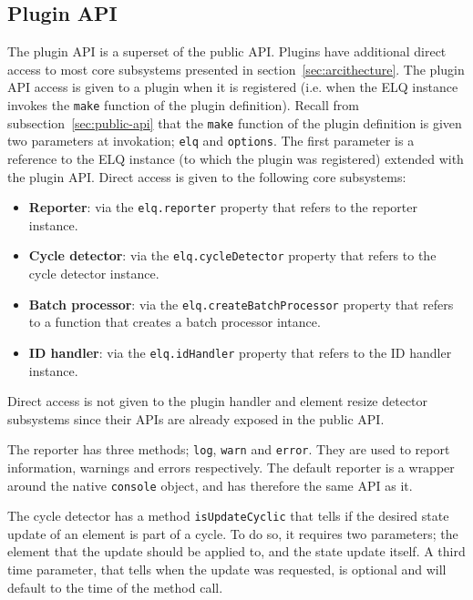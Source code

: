 \documentclass[a4paper,11pt]{kth-mag}
\newcommand{\code}[1]{\texttt{#1}}
\newcommand\abbr[2][]{\uppercase{#2}\ifthenelse{\equal{#1}{}}%
                     {}{#1}}
\begin{document}
        \subsection{Plugin API}
          The plugin \gls{API} is a superset of the public \gls{API}.
          Plugins have additional direct access to most core subsystems presented in section~\ref{sec:arcithecture}.
          The plugin \gls{API} access is given to a plugin when it is registered (i.e. when the \abbr{elq} instance invokes the \code{make} function of the plugin definition).
          Recall from subsection~\ref{sec:public-api} that the \code{make} function of the plugin definition is given two parameters at invokation; \code{elq} and \code{options}.
          The first parameter is a reference to the \abbr{ELQ} instance (to which the plugin was registered) extended with the plugin \gls{API}.
          Direct access is given to the following core subsystems:
          \begin{itemize}
            \item \textbf{Reporter}: via the \code{elq.reporter} property that refers to the reporter instance.
            \item \textbf{Cycle detector}: via the \code{elq.cycleDetector} property that refers to the cycle detector instance.
            \item \textbf{Batch processor}: via the \code{elq.createBatchProcessor} property that refers to a function that creates a batch processor intance.
            \item \textbf{\abbr{ID} handler}: via the \code{elq.idHandler} property that refers to the \abbr{ID} handler instance. 
          \end{itemize}
          Direct access is not given to the plugin handler and element resize detector subsystems since their \glspl{API} are already exposed in the public \gls{API}.

          The reporter has three methods; \code{log}, \code{warn} and \code{error}.
          They are used to report information, warnings and errors respectively.
          The default reporter is a wrapper around the native \code{console} object, and has therefore the same \gls{API} as it.

          The cycle detector has a method \code{isUpdateCyclic} that tells if the desired state update of an element is part of a cycle.
          To do so, it requires two parameters; the element that the update should be applied to, and the state update itself.
          A third time parameter, that tells when the update was requested, is optional and will default to the time of the method call.
\end{document}
